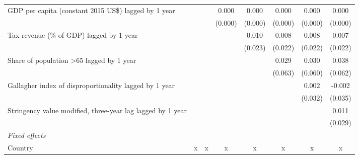 \begin{tabular}{lccccccc}
   GDP per capita (constant 2015 US\$) lagged by 1 year                             &                &                & 0.000          & 0.000          & 0.000          & 0.000          & 0.000\\   
                                                                                    &                &                & (0.000)        & (0.000)        & (0.000)        & (0.000)        & (0.000)\\   
   Tax revenue (\% of GDP) lagged by 1 year                                         &                &                &                & 0.010          & 0.008          & 0.008          & 0.007\\   
                                                                                    &                &                &                & (0.023)        & (0.022)        & (0.022)        & (0.022)\\   
   Share of population >65 lagged by 1 year                                         &                &                &                &                & 0.029          & 0.030          & 0.038\\   
                                                                                    &                &                &                &                & (0.063)        & (0.060)        & (0.062)\\   
   Gallagher index of disproportionality lagged by 1 year                           &                &                &                &                &                & 0.002          & -0.002\\   
                                                                                    &                &                &                &                &                & (0.032)        & (0.035)\\   
   Stringency value modified, three-year lag lagged by 1 year                       &                &                &                &                &                &                & 0.011\\   
                                                                                    &                &                &                &                &                &                & (0.029)\\   
   \emph{Fixed effects}\\
   Country                                                                          & x              & x              & x              & x              & x              & x              & x\\  

\end{tabular}
